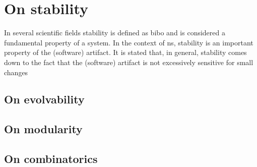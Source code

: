 \section{On stability} \label{sec:on_stability}

In several scientific fields stability is defined as \gls{bibo} and is considered a
fundamental property of a system. In the context of \gls{ns}, stability is an important
property of the (software) artifact. It is stated that, in general, stability comes down to
the fact that the (software) artifact is not excessively sensitive for small changes

\subsection{On evolvability} \label{subsec:on_evolvability}
\subsection{On modularity} \label{subsec:on_modularity}
\subsection{On combinatorics} \label{subsec:on_combinatorics}